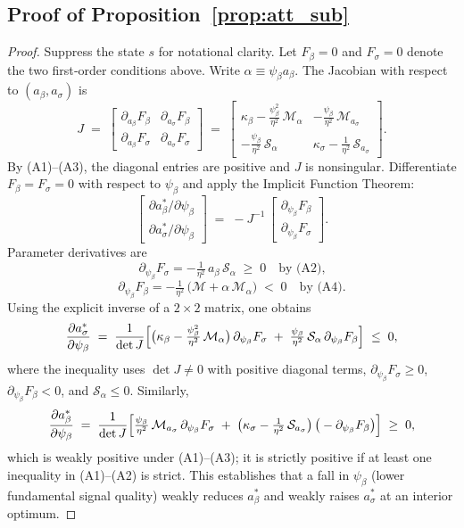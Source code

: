 \documentclass[12pt]{article}
\theoremstyle{plain}
\begin{document}
\subsection{Proof of Proposition~\ref{prop:att_sub}}\label{app:attention_substitution}
\begin{proof}
	Suppress the state $s$ for notational clarity. Let $F_\beta=0$ and $F_\sigma=0$ denote the two first‑order conditions above. Write $\alpha\equiv\psi_\beta a_\beta$. The Jacobian with respect to $(a_\beta,a_\sigma)$ is
	\[
		J\;=\;\begin{bmatrix}
			\partial_{a_\beta}F_\beta  & \partial_{a_\sigma}F_\beta  \\[2pt]
			\partial_{a_\beta}F_\sigma & \partial_{a_\sigma}F_\sigma
		\end{bmatrix}
		\;=\;
		\begin{bmatrix}
			\kappa_\beta-\tfrac{\psi_\beta^{2}}{\eta^2}\,\mathcal M_\alpha & -\tfrac{\psi_\beta}{\eta^2}\,\mathcal M_{a_\sigma}     \\[4pt]
			-\tfrac{\psi_\beta}{\eta^2}\,\mathcal S_\alpha                 & \kappa_\sigma-\tfrac{1}{\eta^2}\,\mathcal S_{a_\sigma}
		\end{bmatrix}.
	\]
	By (A1)–(A3), the diagonal entries are positive and $J$ is nonsingular.
	Differentiate $F_\beta=F_\sigma=0$ with respect to $\psi_\beta$ and apply the
	Implicit Function Theorem:
	\[
		\begin{bmatrix} \partial a_\beta^*/\partial\psi_\beta \\ \partial a_\sigma^*/\partial\psi_\beta \end{bmatrix}
		\;=\; - J^{-1}\,\begin{bmatrix} \partial_{\psi_\beta}F_\beta \\ \partial_{\psi_\beta}F_\sigma \end{bmatrix}.
	\]
	Parameter derivatives are
	\[\partial_{\psi_\beta}F_\sigma = -\tfrac{1}{\eta^2}\,a_\beta\,\mathcal S_\alpha \;\ge\;0\quad\text{by (A2),}\]
	\[\partial_{\psi_\beta}F_\beta = -\tfrac{1}{\eta^2}\,\bigl(\mathcal M+\alpha\,\mathcal M_\alpha\bigr) \;<\;0\quad\text{by (A4).}\]
	Using the explicit inverse of a $2\times2$ matrix, one obtains
	\[
		\frac{\partial a_\sigma^*}{\partial\psi_\beta}
		\;=\;\frac{1}{\det J}\Bigl[\bigl(\kappa_\beta-\tfrac{\psi_\beta^{2}}{\eta^2}\,\mathcal M_\alpha\bigr)\,\partial_{\psi_\beta}F_\sigma \;+\; \tfrac{\psi_\beta}{\eta^2}\,\mathcal S_\alpha\,\partial_{\psi_\beta}F_\beta\Bigr] \;\le\;0,
	\]
	where the inequality uses $\det J\neq0$ with positive diagonal terms,
	$\partial_{\psi_\beta}F_\sigma\ge0$, $\partial_{\psi_\beta}F_\beta<0$, and
	$\mathcal S_\alpha\le0$. Similarly,
	\[
		\frac{\partial a_\beta^*}{\partial\psi_\beta}
		\;=\;\frac{1}{\det J}\Bigl[ \tfrac{\psi_\beta}{\eta^2}\,\mathcal M_{a_\sigma}\,\partial_{\psi_\beta}F_\sigma \;+\; \bigl(\kappa_\sigma-\tfrac{1}{\eta^2}\,\mathcal S_{a_\sigma}\bigr)\,\big(-\partial_{\psi_\beta}F_\beta\big)\Bigr] \;\ge\;0,
	\]
	which is weakly positive under (A1)–(A3); it is strictly positive if at least
	one inequality in (A1)–(A2) is strict. This establishes that a fall in
	$\psi_\beta$ (lower fundamental signal quality) weakly reduces $a_\beta^*$ and
	weakly raises $a_\sigma^*$ at an interior optimum.
\end{proof}
\end{document}
